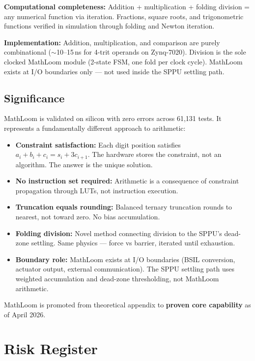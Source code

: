 \documentclass[11pt, a4paper]{report}
\begin{document}
\textbf{Computational completeness:} Addition + multiplication + folding
division = any numerical function via iteration. Fractions, square roots,
and trigonometric functions verified in simulation through folding and
Newton iteration.

\textbf{Implementation:} Addition, multiplication, and comparison are
purely combinational ($\sim$10--15\,ns for 4-trit operands on Zynq-7020).
Division is the sole clocked MathLoom module (2-state FSM, one fold per
clock cycle). MathLoom exists at I/O boundaries only --- not used inside
the SPPU settling path.

\section{Significance}

MathLoom is validated on silicon with zero errors across 61,131 tests.
It represents a fundamentally different approach to arithmetic:
\begin{itemize}[nosep]
  \item \textbf{Constraint satisfaction:} Each digit position satisfies
        $a_i + b_i + c_i = s_i + 3 c_{i+1}$. The hardware stores the
        constraint, not an algorithm. The answer is the unique solution.
  \item \textbf{No instruction set required:} Arithmetic is a consequence
        of constraint propagation through LUTs, not instruction execution.
  \item \textbf{Truncation equals rounding:} Balanced ternary truncation
        rounds to nearest, not toward zero. No bias accumulation.
  \item \textbf{Folding division:} Novel method connecting division to
        the SPPU's dead-zone settling. Same physics --- force vs barrier,
        iterated until exhaustion.
  \item \textbf{Boundary role:} MathLoom exists at I/O boundaries (BSIL
        conversion, actuator output, external communication). The SPPU
        settling path uses weighted accumulation and dead-zone thresholding,
        not MathLoom arithmetic.
\end{itemize}

MathLoom is promoted from theoretical appendix to \textbf{proven core
capability} as of April 2026.

\chapter{Risk Register}
\end{document}
